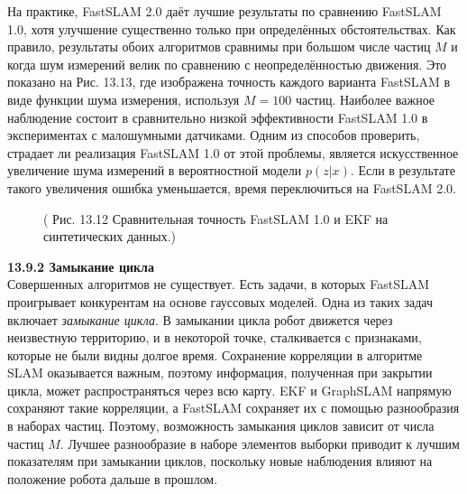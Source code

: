 \documentclass[10pt,a4paper]{article}
\begin{document}
На практике, FastSLAM 2.0 даёт лучшие результаты по сравнению FastSLAM 1.0, хотя улучшение существенно только при определённых обстоятельствах. Как правило, результаты обоих алгоритмов сравнимы при большом числе частиц $M$ и когда шум измерений велик по сравнению с неопределённостью движения. Это показано на Рис. 13.13, где изображена точность каждого варианта FastSLAM в виде функции шума измерения, используя $M=100$ частиц. Наиболее важное наблюдение состоит в сравнительно низкой эффективности FastSLAM 1.0 в экспериментах с малошумными датчиками. Одним из способов проверить, страдает ли реализация FastSLAM 1.0 от этой проблемы, является искусственное увеличение шума измерений в вероятностной модели $p(z|x)$. Если в результате такого увеличения ошибка уменьшается, время переключиться на FastSLAM 2.0.

\begin{figure}[H]
	\caption{ ( Рис. 13.12 Сравнительная точность FastSLAM 1.0 и EKF на синтетических данных.) }
	\label{fig:1312orig}
\end{figure}

\textbf{13.9.2	Замыкание цикла}\\

Совершенных алгоритмов не существует. Есть задачи, в которых FastSLAM проигрывает конкурентам на основе гауссовых моделей.  Одна из таких задач включает \textit{замыкание цикла}. В замыкании цикла робот движется через неизвестную территорию, и в некоторой точке, сталкивается с признаками, которые не были видны долгое время. Сохранение корреляции в алгоритме SLAM оказывается важным, поэтому информация, полученная при закрытии цикла, может распространяться через всю карту. EKF и GraphSLAM напрямую сохраняют такие корреляции, а FastSLAM сохраняет их с помощью разнообразия в наборах частиц. Поэтому, возможность замыкания циклов зависит от числа частиц $M$. Лучшее разнообразие в наборе элементов выборки приводит к лучшим показателям при замыкании циклов, поскольку новые наблюдения влияют на положение робота дальше в прошлом.
\end{document}
